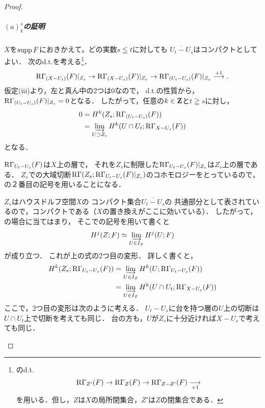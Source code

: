 \begin{proof}
    \subparagraph*{\((a)_k^s\)の証明}
    \(X\)を\(\supp{F}\)におきかえて，どの実数\(s\leqq t\)に対しても
    \(\overline{U_t-U_s}\)はコンパクトとしてよい．
    次のd.t.を考える\footnote{
        \cite[(2.6.32)]{KS90}のd.t.
        \[
            \RG_{Z'}(F)\to\RG_{Z}(F)\to\RG_{Z-Z'}(F)\underset{+1}{\longrightarrow}
        \]
        を用いる．但し，\(Z\)は\(X\)の局所閉集合，\(Z'\)は\(Z\)の閉集合である．
    }．
    \[
        \RG_{(X-U_t)}(F)\rvert_{Z_s}\to
        \RG_{(X-U_s)}(F)\rvert_{Z_s}\to
        \RG_{(U_t-U_s)}(F)\rvert_{Z_s}
        \overset{+1}{\longrightarrow}.
    \]
    仮定(iii)より，左と真ん中の2つは0なので，
    d.t.の性質から，\(\RG_{(U_t-U_s)}(F)\rvert_{Z_s}=0\)となる．
    したがって，任意の\(k\in\zz\)と\(t\geqq s\)に対し，
    \begin{align*}
        0&=H^k(Z_s;\RG_{(U_t-U_s)}(F))\\
        &=\indlim[U\supset Z_s]H^k(U\cap U_t;\RG_{X-U_s}(F))
    \end{align*}
    となる．
    \begin{center}
        \begin{minipage}{.9\textwidth}
        \begin{redleftbar}
            \(\RG_{U_t-U_s}(F)\)は\(X\)上の層で，
            それを\(Z_s\)に制限した\(\RG_{U_t-U_s}(F)\rvert_{Z_s}\)は\(Z_s\)上の層である．
            \(Z_s\)での大域切断\(\RG(Z_s;\RG_{U_t-U_s}(F)\rvert_{Z_s})\)のコホモロジーをとっているので，
            \cite[Notations 2.6.8]{KS90}の２番目の記号を用いることになる．

            \(Z_s\)はハウスドルフ空間\(X\)の
            コンパクト集合\(\overline{U_t-U_s}\)の
            共通部分として表されているので，コンパクトである（\(X\)の置き換えがここに効いている）．
            したがって，\cite[Remark 2.6.9 (ii)]{KS90}の場合に当てはまり，
            そこでの記号を用いて書くと
            \[H^j(Z;F)\simeq\indlim[U\in I_Z]H^j(U;F)\]が成り立つ．
            これが上の式の2つ目の変形．
            詳しく書くと，
            \begin{align*}
                H^k(Z_s;\RG_{U_t-U_s}(F))
                &=\indlim[U\in I_Z]H^k(U;\RG_{U_t-U_s}(F))\\
                &=\indlim[U\in I_Z]H^k(U\cap U_t;\RG_{X-U_s}(F))
            \end{align*}
            ここで，2つ目の変形は次のように考える．
            \(U_t-U_s\)に台を持つ層の\(U\)上の切断は\(U\cap U_t\)上で切断を考えても同じ．
            台の方も，\(U\)が\(Z_s\)に十分近ければ\(X-U_s\)で考えても同じ．
        \end{redleftbar}
    \end{minipage}
    \end{center}
    

\end{proof}
